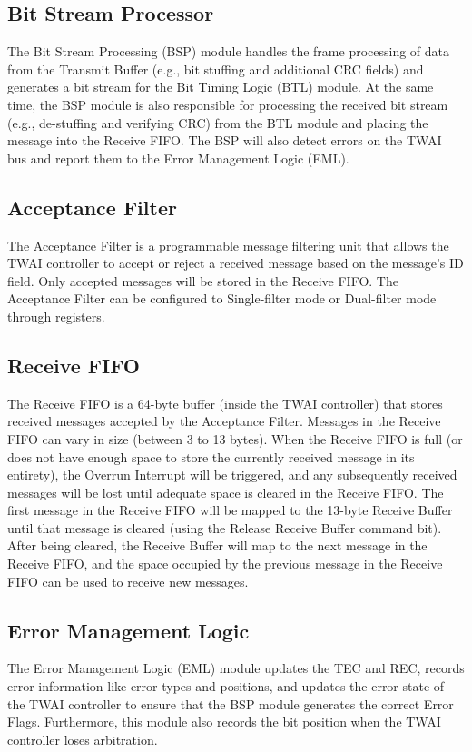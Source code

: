 \documentclass[main\_\_EN.tex]{subfiles}
\begin{document}
\subsection{Bit Stream Processor}
The Bit Stream Processing (BSP) module handles the frame processing of data from the Transmit Buffer (e.g., bit stuffing and additional CRC fields) and generates a bit stream for the Bit Timing Logic (BTL) module. At the same time, the BSP module is also responsible for processing the received bit stream (e.g., de-stuffing and verifying CRC) from the BTL module and placing the message into the Receive FIFO. The BSP will also detect errors on the TWAI bus and report them to the Error Management Logic (EML).

\subsection{Acceptance Filter}
The Acceptance Filter is a programmable message filtering unit that allows the TWAI controller to accept or reject a received message based on the message's ID field. Only accepted messages will be stored in the Receive FIFO. The Acceptance Filter can be configured to Single-filter mode or Dual-filter mode through registers.

\subsection{Receive FIFO}
The Receive FIFO is a 64-byte buffer (inside the TWAI controller) that stores received messages accepted by the Acceptance Filter. Messages in the Receive FIFO can vary in size (between 3 to 13 bytes). When the Receive FIFO is full (or does not have enough space to store the currently received message in its entirety), the Overrun Interrupt will be triggered, and any subsequently received messages will be lost until adequate space is cleared in the Receive FIFO. The first message in the Receive FIFO will be mapped to the 13-byte Receive Buffer until that message is cleared (using the Release Receive Buffer command bit). After being cleared, the Receive Buffer will map to the next message in the Receive FIFO, and the space occupied by the previous message in the Receive FIFO can be used to receive new messages.

\subsection{Error Management Logic}
The Error Management Logic (EML) module updates the TEC and REC, records error information like error types and positions, and updates the error state of the TWAI controller to ensure that the BSP module generates the correct Error Flags. Furthermore, this module also records the bit position when the TWAI controller loses arbitration.
\end{document}
